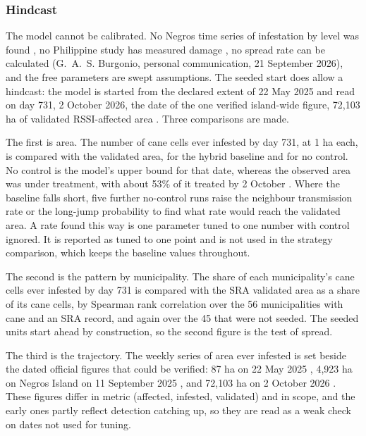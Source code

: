 \subsubsection{Hindcast}

The model cannot be calibrated. No Negros time series of infestation by level was found \citep{SRA2026FOI,PGNO2026}, no Philippine study has measured damage \citep{Guerrero2024}, no spread rate can be calculated (G.~A.~S. Burgonio, personal communication, 21 September 2026), and the free parameters are swept assumptions. The seeded start does allow a hindcast: the model is started from the declared extent of 22 May 2025 and read on day 731, 2 October 2026, the date of the one verified island-wide figure, 72,103 ha of validated RSSI-affected area \citep{SRA2026FOI}. Three comparisons are made.

The first is area. The number of cane cells ever infested by day 731, at 1 ha each, is compared with the validated area, for the hybrid baseline and for no control. No control is the model's upper bound for that date, whereas the observed area was under treatment, with about 53\% of it treated by 2 October \citep{SRA2026FOI}. Where the baseline falls short, five further no-control runs raise the neighbour transmission rate or the long-jump probability to find what rate would reach the validated area. A rate found this way is one parameter tuned to one number with control ignored. It is reported as tuned to one point and is not used in the strategy comparison, which keeps the baseline values throughout.

The second is the pattern by municipality. The share of each municipality's cane cells ever infested by day 731 is compared with the SRA validated area as a share of its cane cells, by Spearman rank correlation over the 56 municipalities with cane and an SRA record, and again over the 45 that were not seeded. The seeded units start ahead by construction, so the second figure is the test of spread.

The third is the trajectory. The weekly series of area ever infested is set beside the dated official figures that could be verified: 87 ha on 22 May 2025 \citep{ManilaBulletin2025}, 4,923 ha on Negros Island on 11 September 2025 \citep{MojicaSevilla2025}, and 72,103 ha on 2 October 2026 \citep{SRA2026FOI}. These figures differ in metric (affected, infested, validated) and in scope, and the early ones partly reflect detection catching up, so they are read as a weak check on dates not used for tuning.

